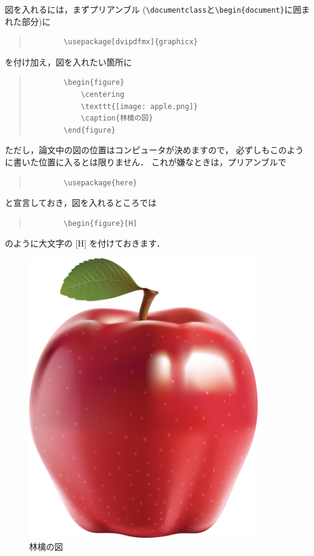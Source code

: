 \documentclass[master]{kuisthesis}		%
\begin{document}
図を入れるには，まずプリアンブル (\verb|\documentclass|と\verb|\begin{document}|に囲まれた部分)に

\begin{quote}
	\begin{verbatim}
		\usepackage[dvipdfmx]{graphicx}
	\end{verbatim}
\end{quote}

を付け加え，図を入れたい箇所に

\begin{quote}
	\begin{verbatim}
		\begin{figure}
			\centering
			\texttt{[image: apple.png]}
			\caption{林檎の図}
		\end{figure}
	\end{verbatim}
\end{quote}

ただし，論文中の図の位置はコンピュータが決めますので，
必ずしもこのように書いた位置に入るとは限りません．
これが嫌なときは，プリアンブルで

\begin{quote}
	\begin{verbatim}
		\usepackage{here}
	\end{verbatim}
\end{quote}

と宣言しておき，図を入れるところでは

\begin{quote}
	\begin{verbatim}
		\begin{figure}[H]
	\end{verbatim}
\end{quote}

のように大文字の [H] を付けておきます．

\begin{figure}[H]
  \centering
  \includegraphics[width=10cm]{fig/apple.png}
  \caption{林檎の図}
\end{figure}

\end{document}

